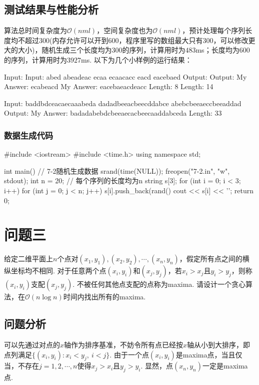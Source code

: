 \documentclass[12pt, a4paper, oneside]{ctexart}
\numberwithin{equation}{section}  %
\def\O{\mathcal{O}}          %
\begin{document}
\subsection{测试结果与性能分析}
算法总时间复杂度为$\O(nml)$，空间复杂度也为$\O(nml)$，预计处理每个序列长度均不超过$300$(内存允许可以开到$600$，程序里写的数组最大只有$300$，可以修改更大的大小)，随机生成三个长度均为$300$的序列，计算用时为$483$ms；长度均为$600$的序列，计算用时为$3927$ms. 以下为几个小样例的运行结果：
\begin{cppcode}
Input:                          Input:
abed                            abeadeac
ecaa                            ecaacacc
eacd                            eacebaed
Output:                         Output:
My Answer: ecabeacd             My Answer: eacebaeacdeacc
Length: 8                       Length: 14

Input:
baddbdceacaecaaabeda
dadadbeeacbeecddabce
abebcbeeaeccbeeaddad
Output:
My Answer: badadabebdcbeeaecacbeecaaddabceda
Length: 33
\end{cppcode}
\subsubsection{数据生成代码}
\begin{cppcode}
#include <iostream>
#include <time.h>
using namespace std;

int main() {  // 7-2随机生成数据
    srand(time(NULL));
    freopen("7-2.in", "w", stdout);
    int n = 20;  // 每个序列的长度均为n
    string s[3];
    for (int i = 0; i < 3; i++) {
        for (int j = 0; j < n; j++)
            s[i].push_back(rand() %
        cout << s[i] << '\n';
    }
    return 0;
}
\end{cppcode}
\section{问题三}
给定二维平面上$n$个点对$(x_1,y_1),(x_2,y_2),\cdots,(x_n,y_n)$，假定所有点之间的横纵坐标均不相同. 对于任意两个点$(x_i,y_i)$和$(x_j,y_j)$，若$x_i>x_j$且$y_i>y_j$，则称$(x_i,y_i)$支配$(x_j,y_j)$. 不被任何其他点支配的点称为maxima. 请设计一个贪心算法，在$\O(n\log n)$时间内找出所有的maxima.
\subsection{问题分析}
可以先通过对点的$x$轴作为排序基准，不妨令所有点已经按$x$轴从小到大排序，即点列满足$\{(x_i,y_i):x_i<y_j,\ i<j\}$. 由于一个点$(x_i,y_i)$是maxima点，当且仅当，不存在$j=1,2,\cdots,n$使得$x_j>x_i$且$y_j>y_i$. 显然，点$(x_n,y_n)$一定是maxima点.
\end{document}
